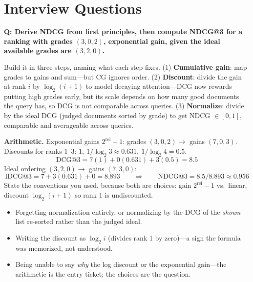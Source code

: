\section{Interview Questions}
\label{sr:sec:eval_interview}

\begin{interviewq}
\textbf{Q: Derive NDCG from first principles, then compute NDCG@3 for a ranking with grades $(3, 0, 2)$, exponential gain, given the ideal available grades are $(3, 2, 0)$.}

 \quad {} \quad \badgefreq{\freqhigh}

\stronganswer

Build it in three steps, naming what each step fixes. (1) \textbf{Cumulative gain}: map grades to gains and sum---but CG ignores order. (2) \textbf{Discount}: divide the gain at rank $i$ by $\log_2(i+1)$ to model decaying attention---DCG now rewards putting high grades early, but its scale depends on how many good documents the query has, so DCG is not comparable across queries. (3) \textbf{Normalize}: divide by the ideal DCG (judged documents sorted by grade) to get NDCG $\in [0,1]$, comparable and averageable across queries.

\textbf{Arithmetic.} Exponential gains $2^{\mathrm{rel}}-1$: grades $(3, 0, 2) \to$ gains $(7, 0, 3)$. Discounts for ranks 1--3: $1,\ 1/\log_2 3 \approx 0.631,\ 1/\log_2 4 = 0.5$.
\begin{equation*}
\mathrm{DCG@}3 = 7(1) + 0(0.631) + 3(0.5) = 8.5
\end{equation*}
Ideal ordering $(3, 2, 0) \to$ gains $(7, 3, 0)$:
\begin{equation*}
\mathrm{IDCG@}3 = 7 + 3(0.631) + 0 = 8.893
\qquad\Rightarrow\qquad
\mathrm{NDCG@}3 = 8.5 / 8.893 \approx 0.956
\end{equation*}
State the conventions you used, because both are choices: gain $2^{\mathrm{rel}}-1$ vs.\ linear, discount $\log_2(i+1)$ so rank 1 is undiscounted.

\redflags
\begin{itemize}
    \item Forgetting normalization entirely, or normalizing by the DCG of the \textit{shown} list re-sorted rather than the judged ideal.
    \item Writing the discount as $\log_2 i$ (divides rank 1 by zero)---a sign the formula was memorized, not understood.
    \item Being unable to say \textit{why} the log discount or the exponential gain---the arithmetic is the entry ticket; the choices are the question.
\end{itemize}


\end{interviewq}

